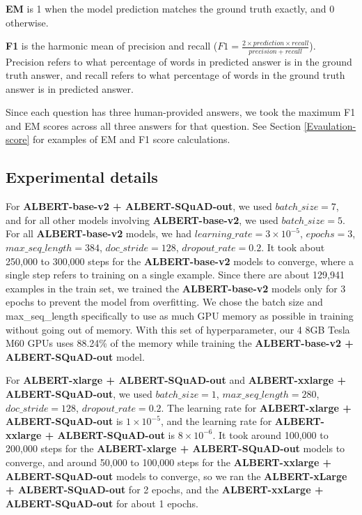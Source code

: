 \documentclass{article}
\begin{document}
\textbf{EM} is 1 when the model prediction matches the ground truth exactly, and 0 otherwise. 

\textbf{F1} is the harmonic mean of precision and recall ($F1 = \frac{2 \times prediction \times recall}{precision + recall}$). Precision refers to what percentage of words in predicted answer is in the ground truth answer, and recall refers to what percentage of words in the ground truth answer is in predicted answer. 

Since each question has three human-provided answers, we took the maximum F1 and EM scores across all three answers for that question. See Section \ref{Evaulation-score} for examples of EM and F1 score calculations.








\subsection{Experimental details} \label{experiment}
For \textbf{ALBERT-base-v2 + ALBERT-SQuAD-out}, we used $batch\_size = 7$, and for all other models involving \textbf{ALBERT-base-v2}, we used $batch\_size = 5$. For all \textbf{ALBERT-base-v2} models, we had $learning\_rate = 3 \times 10^{-5}$, $epochs = 3$, $max\_seq\_length = 384$, $doc\_stride = 128$, $dropout\_rate = 0.2$. It took about 250,000 to 300,000 steps for the \textbf{ALBERT-base-v2} models to converge, where a single step refers to training on a single example. Since there are about 129,941 examples in the train set, we trained the \textbf{ALBERT-base-v2} models only for 3 epochs to prevent the model from overfitting. We chose the batch size and max\_seq\_length specifically to use as much GPU memory as possible in training without going out of memory. With this set of hyperparameter, our 4 8GB Tesla M60 GPUs uses 88.24\% of the memory while training the \textbf{ALBERT-base-v2 + ALBERT-SQuAD-out} model. 

For \textbf{ALBERT-xlarge + ALBERT-SQuAD-out} and \textbf{ALBERT-xxlarge + ALBERT-SQuAD-out}, we used $batch\_size = 1$, $max\_seq\_length = 280$, $doc\_stride = 128$, $dropout\_rate = 0.2$. The learning rate for \textbf{ALBERT-xlarge + ALBERT-SQuAD-out} is $1 \times 10^{-5}$, and the learning rate for \textbf{ALBERT-xxlarge + ALBERT-SQuAD-out} is $8 \times 10^{-6}$. It took around 100,000 to 200,000 steps for the \textbf{ALBERT-xlarge + ALBERT-SQuAD-out} models to converge, and around 50,000 to 100,000 steps for the \textbf{ALBERT-xxlarge + ALBERT-SQuAD-out} models to converge, so we ran the \textbf{ALBERT-xLarge + ALBERT-SQuAD-out} for 2 epochs, and the \textbf{ALBERT-xxLarge + ALBERT-SQuAD-out} for about 1 epochs.
\end{document}
